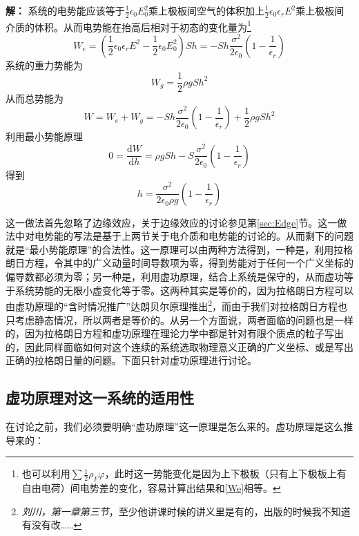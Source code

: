 \documentclass{ctexart}
\newcommand{\epsz}{\epsilon_0}
\newcommand{\epsr}{\epsilon_r}
\newcommand{\dd}[2]{\frac{\mathrm d #1}{\mathrm d #2}}
\begin{document}
	\textbf{解：} 系统的电势能应该等于$\frac{1}{2}\epsz E_0^2$乘上极板间空气的体积加上$\frac{1}{2}\epsz\epsr E^2$乘上极板间介质的体积。从而电势能在抬高后相对于初态的变化量为\footnote{也可以利用$\sum\frac{1}{2}\rho_F\varphi$，此时这一势能变化是因为上下极板（只有上下极板上有自由电荷）间电势差的变化，容易计算出结果和\eqref{We}相等。}
	\begin{equation}\label{We}
	W_e=\left(\frac{1}{2}\epsz\epsr E^2-\frac{1}{2}\epsz E_0^2\right)Sh=-Sh\frac{\sigma^2}{2\epsz}\left(1-\frac{1}{\epsr}\right)
	\end{equation}
	系统的重力势能为
	\begin{equation}
	W_g=\frac{1}{2}\rho gSh^2
	\end{equation}
	从而总势能为
	\begin{equation}
	W=W_e+W_g=-Sh\frac{\sigma^2}{2\epsz}\left(1-\frac{1}{\epsr}\right)+\frac{1}{2}\rho gSh^2
	\end{equation}
	利用最小势能原理
	\begin{equation}
	0=\dd{W}{h}=\rho gSh-S\frac{\sigma^2}{2\epsz}\left(1-\frac{1}{\epsr}\right)
	\end{equation}
	得到
	\begin{equation}
	h=\frac{\sigma^2}{2\epsz\rho g}\left(1-\frac{1}{\epsr}\right)
	\end{equation}
	
	这一做法首先忽略了边缘效应，关于边缘效应的讨论参见第\ref{sec:Edge}节。这一做法中对电势能的写法是基于上两节关于电介质和电势能的讨论的。从而剩下的问题就是“最小势能原理”的合法性。这一原理可以由两种方法得到，一种是，利用拉格朗日方程，令其中的广义动量时间导数项为零，得到势能对于任何一个广义坐标的偏导数都必须为零；另一种是，利用虚功原理，结合上系统是保守的，从而虚功等于系统势能的无限小虚变化等于零。这两种其实是等价的，因为拉格朗日方程可以由虚功原理的“含时情况推广”达朗贝尔原理推出\footnote{\textit{刘川，第一章第三节}，至少他讲课时候的讲义里是有的，出版的时候我不知道有没有改……}，而由于我们对拉格朗日方程也只考虑静态情况，所以两者是等价的。从另一个方面说，两者面临的问题也是一样的，因为拉格朗日方程和虚功原理在理论力学中都是针对有限个质点的粒子写出的，因此同样面临如何对这个连续的系统选取物理意义正确的广义坐标、或是写出正确的拉格朗日量的问题。下面只针对虚功原理进行讨论。
	
	\subsection{虚功原理对这一系统的适用性}
	
	在讨论之前，我们必须要明确“虚功原理”这一原理是怎么来的。虚功原理是这么推导来的：
	
\end{document}
